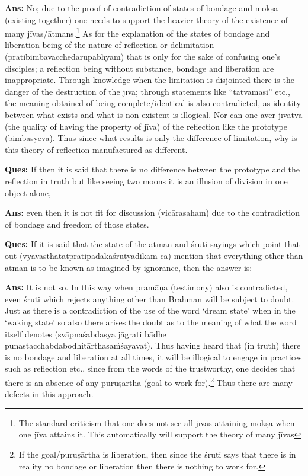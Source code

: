 \textbf{Ans:} No; due to the proof of contradiction of states of bondage and mokṣa (existing together) one needs to support the  heavier theory of the existence of many jīvas/ātmans.\footnote{The standard criticism that one does not see all jīvas attaining mokṣa when one jīva attains it. This automatically will support the theory of many jīvas} As for the explanation of the states of bondage and liberation being of the nature of reflection or delimitation (pratibimbāvacchedarūpābhyām) that is only for the sake of confusing one’s disciples; a reflection being without substance, bondage and liberation are inappropriate.  Through knowledge when the limitation is disjointed there is the danger of the destruction of the jīva; through statements like “tatvamasi” etc., the meaning obtained of being complete/identical is also contradicted, as identity between what exists and what is non-existent is illogical. Nor can one aver jīvatva (the quality of having the property of jīva) of the reflection like the prototype (bimbasyeva). Thus since what results is only the difference of limitation, why is this theory of reflection manufactured as different.

\textbf{Ques:} If then it is said that there is no difference between the prototype and the reflection in truth but like seeing two moons it is an illusion of division in one object alone, 

\textbf{Ans:} even then it is not fit for discussion (vicārasaham) due to the contradiction of bondage and freedom of those states.

\textbf{Ques:} If it is said that the state of the ātman and śruti sayings which point that out (vyavasthātatpratipādakaśrutyādikam ca) mention that everything other than ātman is to be known as imagined by ignorance, then the answer is:

\textbf{Ans:} It is not so. In this way when pramāṇa (testimony) also is contradicted, even śruti which rejects anything other than Brahman will be subject to doubt. Just as there is a contradiction of the use of the word ‘dream state’ when in the ‘waking state’ so also there arises the doubt as to  the meaning of what the word itself denotes (svāpnaśabdasya jāgrati bādhe punastacchabdabodhitārthasaṁśayavat). Thus having heard that (in truth) there is no bondage and liberation at all times, it will be illogical to engage in practices such as reflection etc., since from the words of the trustworthy, one decides that there is an absence of any puruṣārtha (goal to work for).\footnote{If the goal/puruṣārtha is liberation, then since the śruti says that there is in reality no bondage or liberation then there is nothing to work for.} Thus there are many defects in this approach.

